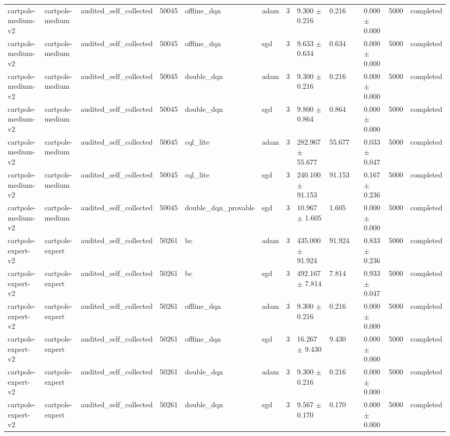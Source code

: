 \begin{table}[t]
\begin{tabular}{llllllllllll}
cartpole-medium-v2 & cartpole-medium & audited\_self\_collected & 50045 & offline\_dqn & adam & 3 & 9.300 $\pm$ 0.216 & 0.216 &  & 0.000 $\pm$ 0.000 & 5000 & completed \\
cartpole-medium-v2 & cartpole-medium & audited\_self\_collected & 50045 & offline\_dqn & sgd & 3 & 9.633 $\pm$ 0.634 & 0.634 &  & 0.000 $\pm$ 0.000 & 5000 & completed \\
cartpole-medium-v2 & cartpole-medium & audited\_self\_collected & 50045 & double\_dqn & adam & 3 & 9.300 $\pm$ 0.216 & 0.216 &  & 0.000 $\pm$ 0.000 & 5000 & completed \\
cartpole-medium-v2 & cartpole-medium & audited\_self\_collected & 50045 & double\_dqn & sgd & 3 & 9.800 $\pm$ 0.864 & 0.864 &  & 0.000 $\pm$ 0.000 & 5000 & completed \\
cartpole-medium-v2 & cartpole-medium & audited\_self\_collected & 50045 & cql\_lite & adam & 3 & 282.967 $\pm$ 55.677 & 55.677 &  & 0.033 $\pm$ 0.047 & 5000 & completed \\
cartpole-medium-v2 & cartpole-medium & audited\_self\_collected & 50045 & cql\_lite & sgd & 3 & 240.100 $\pm$ 91.153 & 91.153 &  & 0.167 $\pm$ 0.236 & 5000 & completed \\
cartpole-medium-v2 & cartpole-medium & audited\_self\_collected & 50045 & double\_dqn\_provable & sgd & 3 & 10.967 $\pm$ 1.605 & 1.605 &  & 0.000 $\pm$ 0.000 & 5000 & completed \\
cartpole-expert-v2 & cartpole-expert & audited\_self\_collected & 50261 & bc & adam & 3 & 435.000 $\pm$ 91.924 & 91.924 &  & 0.833 $\pm$ 0.236 & 5000 & completed \\
cartpole-expert-v2 & cartpole-expert & audited\_self\_collected & 50261 & bc & sgd & 3 & 492.167 $\pm$ 7.814 & 7.814 &  & 0.933 $\pm$ 0.047 & 5000 & completed \\
cartpole-expert-v2 & cartpole-expert & audited\_self\_collected & 50261 & offline\_dqn & adam & 3 & 9.300 $\pm$ 0.216 & 0.216 &  & 0.000 $\pm$ 0.000 & 5000 & completed \\
cartpole-expert-v2 & cartpole-expert & audited\_self\_collected & 50261 & offline\_dqn & sgd & 3 & 16.267 $\pm$ 9.430 & 9.430 &  & 0.000 $\pm$ 0.000 & 5000 & completed \\
cartpole-expert-v2 & cartpole-expert & audited\_self\_collected & 50261 & double\_dqn & adam & 3 & 9.300 $\pm$ 0.216 & 0.216 &  & 0.000 $\pm$ 0.000 & 5000 & completed \\
cartpole-expert-v2 & cartpole-expert & audited\_self\_collected & 50261 & double\_dqn & sgd & 3 & 9.567 $\pm$ 0.170 & 0.170 &  & 0.000 $\pm$ 0.000 & 5000 & completed \\

\end{tabular}
\end{table}
